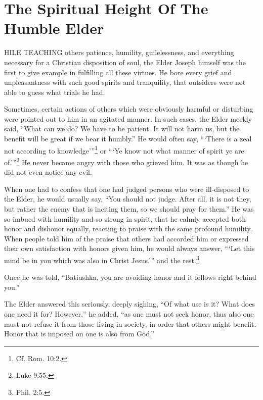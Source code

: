 \chapter{The Spiritual Height Of The Humble Elder}
HILE TEACHING others patience, humility, guilelessness, and everything necessary for a Christian disposition of soul, the Elder Joseph himself was the first to give example in fulfilling all these virtues. He bore every grief and unpleasantness with such good spirits and tranquility, that outsiders were not able to guess what trials he had.

Sometimes, certain actions of others which were obviously harmful or disturbing were pointed out to him in an agitated manner. In such cases, the Elder meekly said, ``What can we do? We have to be patient. It will not harm us, but the benefit will be great if we bear it humbly.'' He would often say, ```There is a zeal not according to knowledge'''\footnote{Cf. Rom. 10:2.} or ```Ye know not what manner of spirit ye are of.'''\footnote{Luke 9:55.} He never became angry with those who grieved him. It was as though he did not even notice any evil.

When one had to confess that one had judged persons who were ill-disposed to the Elder, he would usually say, ``You should not judge. After all, it is not they, but rather the enemy that is inciting them, so we should pray for them.'' He was so imbued with humility and so strong in spirit, that he calmly accepted both honor and dishonor equally, reacting to praise with the same profound humility. When people told him of the praise that others had accorded him or expressed their own satisfaction with honors given him, he would always answer, ```Let this mind be in you which was also in Christ Jesus.''' and the rest.\footnote{Phil. 2:5.}

Once he was told, ``Batiushka, you are avoiding honor and it follows right behind you.''

The Elder answered this seriously, deeply sighing, ``Of what use is it? What does one need it for? However,'' he added, ``as one must not seek honor, thus also one must not refuse it from those living in society, in order that others might benefit. Honor that is imposed on one is also from God.''

